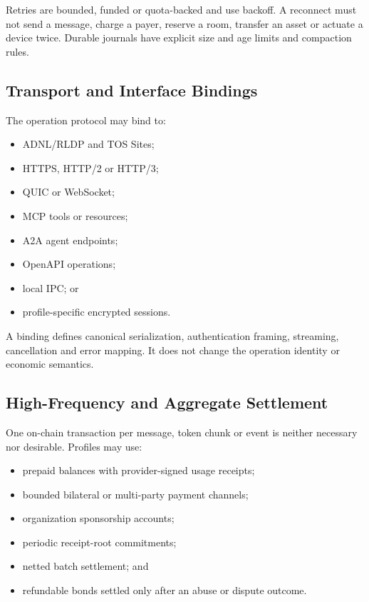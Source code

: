 \documentclass[11pt,oneside]{article}
\begin{document}
Retries are bounded, funded or quota-backed and use backoff. A reconnect must not send a
message, charge a payer, reserve a room, transfer an asset or actuate a device twice. Durable
journals have explicit size and age limits and compaction rules.

\subsection{Transport and Interface Bindings}

The operation protocol may bind to:

\begin{itemize}
  \item ADNL/RLDP and TOS Sites;
  \item HTTPS, HTTP/2 or HTTP/3;
  \item QUIC or WebSocket;
  \item MCP tools or resources;
  \item A2A agent endpoints;
  \item OpenAPI operations;
  \item local IPC; or
  \item profile-specific encrypted sessions.
\end{itemize}

A binding defines canonical serialization, authentication framing, streaming, cancellation
and error mapping. It does not change the operation identity or economic semantics.

\subsection{High-Frequency and Aggregate Settlement}

One on-chain transaction per message, token chunk or event is neither necessary nor desirable.
Profiles may use:

\begin{itemize}
  \item prepaid balances with provider-signed usage receipts;
  \item bounded bilateral or multi-party payment channels;
  \item organization sponsorship accounts;
  \item periodic receipt-root commitments;
  \item netted batch settlement; and
  \item refundable bonds settled only after an abuse or dispute outcome.
\end{itemize}
\end{document}
